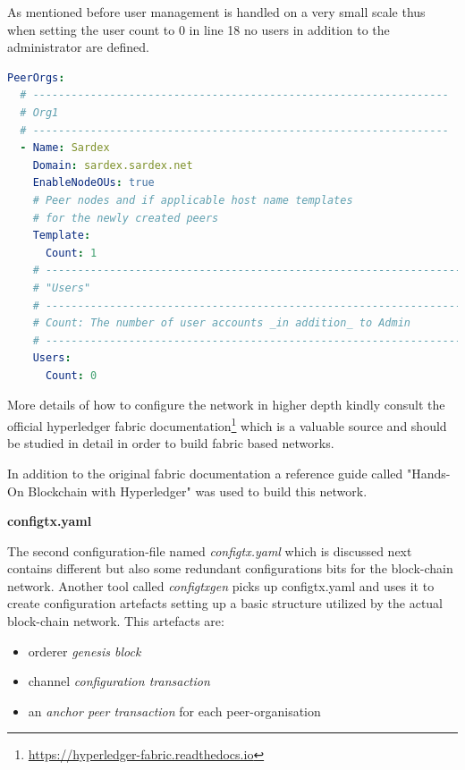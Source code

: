 As mentioned before user management is handled on a very small scale thus when setting the user count to 0 in line 18 no users in addition to the administrator are defined. 

\begin{center}
\begin{minipage}{0.8\textwidth}
\small
\begin{lstlisting}[language=yaml,firstnumber=1,caption={\bf\small crypto-config.yaml excerpt - Peer(s) definition}, captionpos=b,label=lst:cryConPeers]
PeerOrgs:
  # -----------------------------------------------------------------
  # Org1
  # -----------------------------------------------------------------
  - Name: Sardex
    Domain: sardex.sardex.net
    EnableNodeOUs: true
    # Peer nodes and if applicable host name templates
    # for the newly created peers
    Template:
      Count: 1
    # -----------------------------------------------------------------
    # "Users"
    # -----------------------------------------------------------------
    # Count: The number of user accounts _in addition_ to Admin
    # -----------------------------------------------------------------
    Users:
      Count: 0
\end{lstlisting}
\end{minipage}
\end{center}

More details of how to configure the network in higher depth kindly consult the official hyperledger fabric documentation\footnote{\url{https://hyperledger-fabric.readthedocs.io}} which is a valuable source and should be studied in detail in order to build fabric based networks.

In addition to the original fabric documentation a reference guide called "Hands-On Blockchain with Hyperledger" \cite{HandsOnBlockchainHyperledger2018} was used to build this network.

\textbf{configtx.yaml}

The second configuration-file named \textit{configtx.yaml} which is discussed next contains different but also some redundant configurations bits for the block-chain network. Another tool called \textit{configtxgen} picks up configtx.yaml and uses it to create configuration artefacts setting up a basic structure utilized by the actual block-chain network. This artefacts are:

\begin{itemize}
	\item orderer \textit{genesis block}
	\item channel \textit{configuration transaction}
	\item an \textit{anchor peer transaction} for each peer-organisation
\end{itemize}

